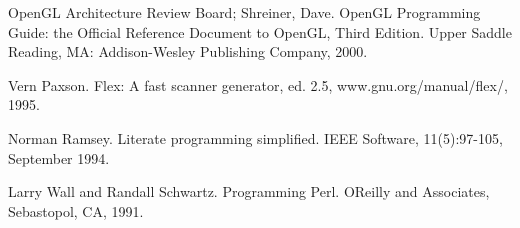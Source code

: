 OpenGL Architecture Review Board; Shreiner, Dave. OpenGL Programming
Guide: the Official Reference Document to OpenGL, Third Edition. Upper
Saddle Reading, MA: Addison-Wesley Publishing Company, 2000.

Vern Paxson. Flex: A fast scanner generator, ed. 2.5,
www.gnu.org/manual/flex/, 1995.

Norman Ramsey. Literate programming simplified. IEEE Software,
11(5):97-105, September 1994. 

Larry Wall and Randall Schwartz. Programming Perl.
O{\textquotesingle}Reilly and Associates, Sebastopol, CA, 1991.
